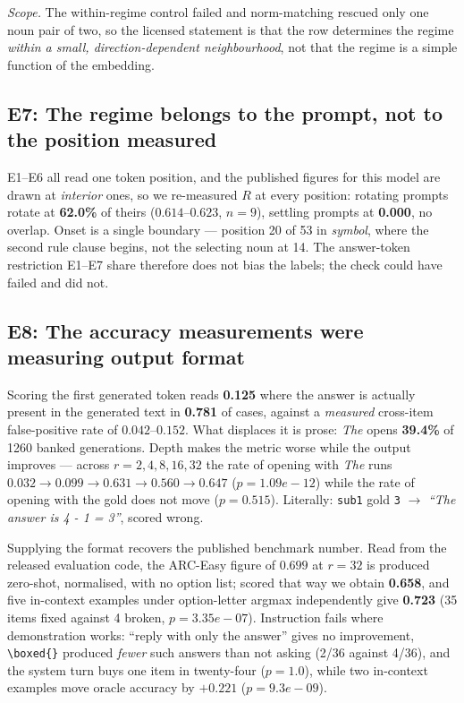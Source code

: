 \documentclass[11pt,a4paper]{article}
\begin{document}
\textit{Scope.} The within-regime control failed and norm-matching rescued only one noun pair of
two, so the licensed statement is that the row determines the regime \emph{within a small,
direction-dependent neighbourhood}, not that the regime is a simple function of the embedding.

\subsection*{E7: The regime belongs to the prompt, not to the position measured}

E1--E6 all read one token position, and the published figures for this model are drawn at
\emph{interior} ones, so we re-measured $R$ at every position: rotating prompts rotate at
\textbf{62.0\%} of theirs ($0.614$--$0.623$, $n=9$), settling prompts at \textbf{0.000}, no
overlap. Onset is a single boundary --- position 20 of 53 in \emph{symbol}, where the second rule
clause begins, not the selecting noun at 14. The answer-token restriction E1--E7 share therefore
does not bias the labels; the check could have failed and did not.

\subsection*{E8: The accuracy measurements were measuring output format}

Scoring the first generated token reads \textbf{0.125} where the answer is actually present in the
generated text in \textbf{0.781} of cases, against a \emph{measured} cross-item false-positive rate
of $0.042$--$0.152$. What displaces it is prose: \emph{The} opens \textbf{39.4\%} of 1260 banked
generations. Depth makes the metric worse while the output improves --- across $r = 2,4,8,16,32$
the rate of opening with \emph{The} runs $0.032 \to 0.099 \to 0.631 \to 0.560 \to 0.647$
($p = 1.09e{-}12$) while the rate of opening with the gold does not move ($p = 0.515$). Literally:
\texttt{sub1} gold \texttt{3} $\to$ \emph{``The answer is 4 - 1 = 3''}, scored wrong.

Supplying the format recovers the published benchmark number. Read from the released evaluation
code, the ARC-Easy figure of $0.699$ at $r=32$ is produced zero-shot, normalised, with no option
list; scored that way we obtain \textbf{0.658}, and five in-context examples under option-letter
argmax independently give \textbf{0.723} (35 items fixed against 4 broken, $p = 3.35e{-}07$).
Instruction fails where demonstration works: ``reply with only the answer'' gives no improvement,
\verb|\boxed{}| produced \emph{fewer} such answers than not asking (2/36 against 4/36), and the
system turn buys one item in twenty-four ($p = 1.0$), while two in-context examples move oracle
accuracy by $\mathbf{+0.221}$ ($p = 9.3e{-}09$).
\end{document}
